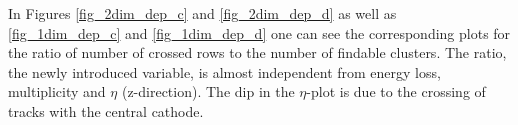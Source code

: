 \documentclass[12pt]{article}
\newlength{\mylinewidth}
\begin{document}
\noindent In Figures \ref{fig_2dim_dep_c} and \ref{fig_2dim_dep_d} as well as \ref{fig_1dim_dep_c} and \ref{fig_1dim_dep_d} one can see the corresponding plots for the ratio of number of crossed rows to the number of findable clusters. The ratio, the newly introduced variable, is almost independent from energy loss, multiplicity and $\eta$ (z-direction). The dip in the $\eta$-plot is due to the crossing of tracks with the central cathode.



\begin{figure}[htbp]
\centering \mbox{
  }

\end{figure}
\end{document}
